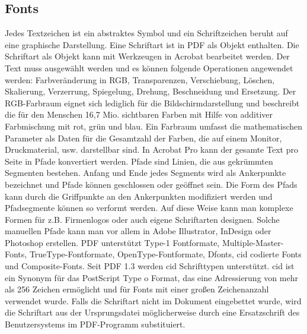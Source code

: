 \subsection{Fonts}
Jedes Textzeichen ist ein abstraktes Symbol und ein Schriftzeichen beruht auf eine graphische Darstellung. Eine Schriftart ist in PDF als Objekt enthalten. Die Schriftart als Objekt kann mit Werkzeugen in Acrobat bearbeitet werden. Der Text muss ausgewählt werden und es können folgende Operationen angewendet werden: Farbveränderung in RGB, Transparenzen, Verschiebung, Löschen, Skalierung, Verzerrung, Spiegelung, Drehung, Beschneidung und Ersetzung. Der RGB-Farbraum eignet sich lediglich für die Bildschirmdarstellung und beschreibt die für den Menschen 16,7 Mio. sichtbaren Farben mit Hilfe von additiver Farbmischung mit rot, grün und blau. Ein Farbraum umfasst die mathematischen Parameter als Daten für die Gesamtzahl der Farben, die auf einem Monitor, Druckmaterial, usw. darstellbar sind. 
\cite{farbraum}
In Acrobat Pro kann der gesamte Text pro Seite in Pfade konvertiert werden. Pfade sind Linien, die aus gekrümmten Segmenten bestehen. Anfang und Ende jedes Segments wird als Ankerpunkte bezeichnet und Pfade können geschlossen oder geöffnet sein. Die Form des Pfads kann durch die Griffpunkte an den Ankerpunkten modifiziert werden und Pfadsegmente können so verformt werden. \cite{adobe-pfade} Auf diese Weise kann man komplexe Formen für z.B. Firmenlogos oder auch eigene Schriftarten designen. Solche manuellen Pfade kann man vor allem in Adobe Illustrator, InDesign oder Photoshop erstellen. PDF unterstützt Type-1 Fontformate, Multiple-Master-Fonts, TrueType-Fontformate, OpenType-Fontformate, Dfonts, \gls{cid} codierte Fonts und Composite-Fonts. Seit PDF 1.3 werden \gls{cid} Schrifttypen unterstützt. \gls{cid} ist ein Synonym für das PostScript Type o Format, das eine Adressierung von mehr als 256 Zeichen ermöglicht und für Fonts mit einer großen Zeichenanzahl verwendet wurde. \cite{typoinfo} Falls die Schriftart nicht im Dokument eingebettet wurde, wird die Schriftart aus der Ursprungsdatei möglicherweise durch eine Ersatzschrift des Benutzersystems im PDF-Programm substituiert. \cite{schneeberger}

